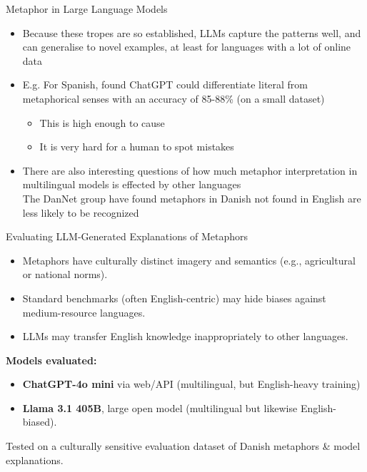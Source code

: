 \documentclass[xetex]{beamer}
\begin{document}
\begin{frame}{Metaphor in Large Language Models}
  \begin{itemize}
  \item Because these tropes are so established, LLMs capture the
    patterns well, and can generalise to novel examples, at least for languages with a lot of online data
  \item E.g. For Spanish, \citet{puraivan2024metaphor} found ChatGPT
    could differentiate literal from metaphorical senses with an
    accuracy of 85-88\% (on a small dataset)
    \begin{itemize}
    \item This is high enough to cause 
    \item It is very hard for a human to spot mistakes
    \end{itemize}
  \item There are also interesting questions of how much metaphor
    interpretation in multilingual models is effected by other languages
    \\ The DanNet group have found metaphors in Danish not found in English are less likely to be recognized

  \end{itemize}%

  
 \end{frame}

 \begin{frame}{Evaluating LLM-Generated Explanations of Metaphors
     \citep{Pedersen:Soerensen:Nimb:Hansen:Olsen:Al-Laith:2025} }

\begin{itemize}
  \item Metaphors have culturally distinct imagery and semantics (e.g., agricultural or national norms).
  \item Standard benchmarks (often English-centric) may hide biases against medium-resource languages.
  \item  LLMs may transfer English knowledge inappropriately to other languages.
\end{itemize}

\smallskip
\textbf{Models evaluated:}
\begin{itemize}
  \item \textbf{ChatGPT-4o mini} via web/API (multilingual, but English-heavy training)
  \item \textbf{Llama 3.1 405B}, large open model (multilingual but likewise English-biased).
\end{itemize}

\smallskip
Tested on a  culturally sensitive evaluation dataset of Danish metaphors \& model explanations.
\end{frame}
\end{document}
